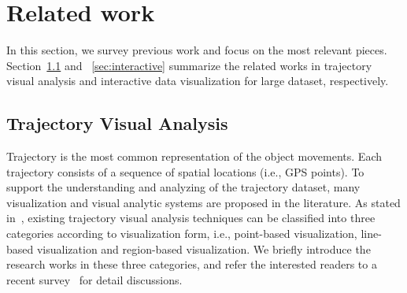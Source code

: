 \section{Related work}\label{sec:rel}
In this section, we survey previous work and focus on the most relevant pieces.
Section~\ref{sec:trajvisana} and ~\ref{sec:interactive} summarize the related works in trajectory visual analysis and interactive data visualization for large dataset, respectively.

\subsection{Trajectory Visual Analysis}\label{sec:trajvisana}
Trajectory is the most common representation of the object movements.
Each trajectory consists of a sequence of spatial locations (i.e., GPS points).
To support the understanding and analyzing of the trajectory dataset,
many visualization and visual analytic systems are proposed in the literature.
As stated in~\cite{chen2015survey}, existing trajectory visual analysis techniques can be classified into three categories according to visualization form,
i.e., point-based visualization, line-based visualization and region-based visualization.
We briefly introduce the research works in these three categories, and refer the interested readers to a recent survey~\cite{chen2015survey} for detail discussions.

